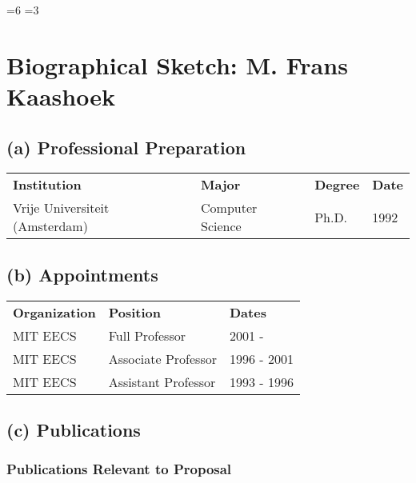 \documentclass{article}
\begin{document}
=6 %
=3 %
\section*{Biographical Sketch: M. Frans Kaashoek}

\subsection*{(a) Professional Preparation}

\begin{tabular}{p{2in}p{1.5in}p{1in}p{1in}}
{\bf Institution} & {\bf Major} & {\bf Degree} & {\bf Date}\\
Vrije Universiteit (Amsterdam) & Computer Science & Ph.D. & 1992 \\
\end{tabular}

\subsection*{(b) Appointments}

\begin{tabular}{p{1.25in}p{2in}p{2in}}
{\bf Organization} & {\bf Position} & {\bf Dates}\\
MIT EECS & Full Professor & 2001 -\\
MIT EECS & Associate Professor & 1996 - 2001 \\
MIT EECS & Assistant Professor & 1993 - 1996 \\
\end{tabular}

\vspace{0.1in}


\subsection*{(c) Publications}

\subsubsection*{Publications Relevant to Proposal}
\end{document}
